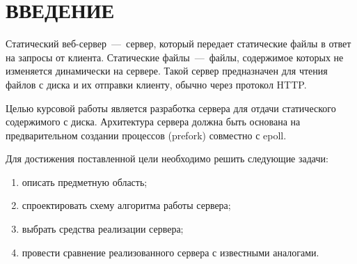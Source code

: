 \chapter*{ВВЕДЕНИЕ}

Статический веб-сервер~---~сервер, который передает статические файлы в ответ на запросы от клиента. 
Статические файлы~---~файлы, содержимое которых не изменяется динамически на сервере.
Такой сервер предназначен для чтения файлов с диска и их отправки клиенту, обычно через протокол HTTP.

Целью курсовой работы является разработка сервера для отдачи статического содержимого с диска.
Архитектура сервера должна быть основана на предварительном создании процессов (prefork) совместно с epoll.

Для достижения поставленной цели необходимо решить следующие задачи:
\begin{enumerate}
	\item описать предметную область;
	\item спроектировать схему алгоритма работы сервера;
	\item выбрать средства реализации сервера;
	\item провести сравнение реализованного сервера с известными аналогами.
\end{enumerate} 
